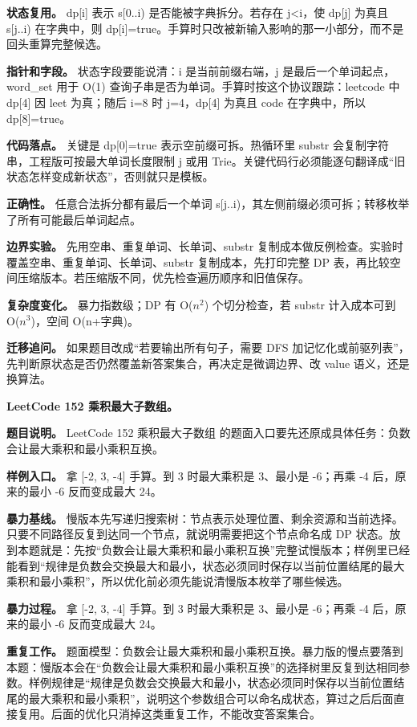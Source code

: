 \textbf{状态复用。} dp[i] 表示 s[0..i) 是否能被字典拆分。若存在 j<i，使 dp[j] 为真且 s[j..i) 在字典中，则 dp[i]=true。手算时只改被新输入影响的那一小部分，而不是回头重算完整候选。

\textbf{指针和字段。} 状态字段要能说清：i 是当前前缀右端，j 是最后一个单词起点，word\_set 用于 O(1) 查询子串是否为单词。手算时按这个协议跟踪：leetcode 中 dp[4] 因 leet 为真；随后 i=8 时 j=4，dp[4] 为真且 code 在字典中，所以 dp[8]=true。

\textbf{代码落点。} 关键是 dp[0]=true 表示空前缀可拆。热循环里 substr 会复制字符串，工程版可按最大单词长度限制 j 或用 Trie。关键代码行必须能逐句翻译成“旧状态怎样变成新状态”，否则就只是模板。

\textbf{正确性。} 任意合法拆分都有最后一个单词 s[j..i)，其左侧前缀必须可拆；转移枚举了所有可能最后单词起点。

\textbf{边界实验。} 先用空串、重复单词、长单词、substr 复制成本做反例检查。实验时覆盖空串、重复单词、长单词、substr 复制成本，先打印完整 DP 表，再比较空间压缩版本。若压缩版不同，优先检查遍历顺序和旧值保存。

\textbf{复杂度变化。} 暴力指数级；DP 有 O(\ensuremath{n^{2}}) 个切分检查，若 substr 计入成本可到 O(\ensuremath{n^{3}})，空间 O(n+字典)。

\textbf{迁移追问。} 如果题目改成“若要输出所有句子，需要 DFS 加记忆化或前驱列表”，先判断原状态是否仍然覆盖新答案集合，再决定是微调边界、改 value 语义，还是换算法。

\noindent\textbf{LeetCode 152 乘积最大子数组。}

\textbf{题目说明。} LeetCode 152 乘积最大子数组 的题面入口要先还原成具体任务：负数会让最大乘积和最小乘积互换。

\textbf{样例入口。} 拿 [-2, 3, -4] 手算。到 3 时最大乘积是 3、最小是 -6；再乘 -4 后，原来的最小 -6 反而变成最大 24。

\textbf{暴力基线。} 慢版本先写递归搜索树：节点表示处理位置、剩余资源和当前选择。只要不同路径反复到达同一个节点，就说明需要把这个节点命名成 DP 状态。放到本题就是：先按“负数会让最大乘积和最小乘积互换”完整试慢版本；样例里已经能看到“规律是负数会交换最大和最小，状态必须同时保存以当前位置结尾的最大乘积和最小乘积”，所以优化前必须先能说清慢版本枚举了哪些候选。

\textbf{暴力过程。} 拿 [-2, 3, -4] 手算。到 3 时最大乘积是 3、最小是 -6；再乘 -4 后，原来的最小 -6 反而变成最大 24。

\textbf{重复工作。} 题面模型：负数会让最大乘积和最小乘积互换。暴力版的慢点要落到本题：慢版本会在“负数会让最大乘积和最小乘积互换”的选择树里反复到达相同参数。样例规律是“规律是负数会交换最大和最小，状态必须同时保存以当前位置结尾的最大乘积和最小乘积”，说明这个参数组合可以命名成状态，算过之后后面直接复用。后面的优化只消掉这类重复工作，不能改变答案集合。

